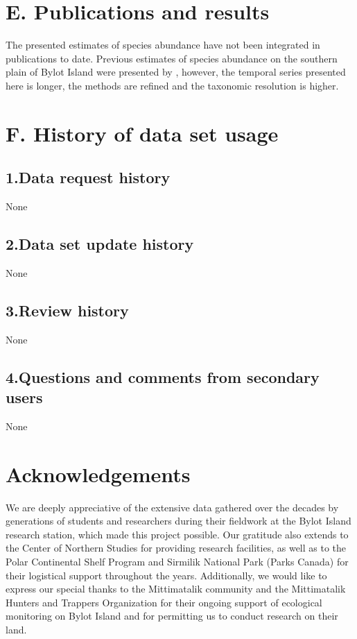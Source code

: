 \documentclass[a4paper,twoside,12pt]{article}
\begin{document}
       
    \section*{E. Publications and results}
The presented estimates of species abundance have not been integrated in publications to date. Previous estimates of species abundance on the southern plain of Bylot Island were presented by \citet{legagneux2012}, however, the temporal series presented here is longer, the methods are refined and the taxonomic resolution is higher.
   
   \section*{F. History of data set usage}
       \subsection*{1.Data request history} None
       \subsection*{2.Data set update history} None
       \subsection*{3.Review history}  None
       \subsection*{4.Questions and comments from secondary users} None
   
   \section*{Acknowledgements}
We are deeply appreciative of the extensive data gathered over the decades by generations of students and researchers during their fieldwork at the Bylot Island research station, which made this project possible. Our gratitude also extends to the Center of Northern Studies for providing research facilities, as well as to the Polar Continental Shelf Program and Sirmilik National Park (Parks Canada) for their logistical support throughout the years. Additionally, we would like to express our special thanks to the Mittimatalik community and the Mittimatalik Hunters and Trappers Organization for their ongoing support of ecological monitoring on Bylot Island and for permitting us to conduct research on their land.
   
\clearpage

\end{document}
